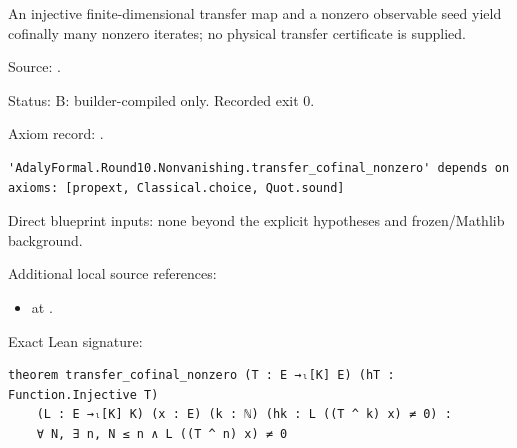 \begin{theorem}[bp-187]
\label{bp-187}
\uses{}
\leanok
An injective finite-dimensional transfer map and a nonzero observable seed yield cofinally many nonzero iterates; no physical transfer certificate is supplied.

\par Source: \texttt{}.
\par Status: B: builder-compiled only. Recorded exit 0.
\par Axiom record: \texttt{}.
\begin{verbatim}
'AdalyFormal.Round10.Nonvanishing.transfer_cofinal_nonzero' depends on axioms: [propext, Classical.choice, Quot.sound]
\end{verbatim}
\par Direct blueprint inputs: none beyond the explicit hypotheses and frozen/Mathlib background.
\par Additional local source references:
\begin{itemize}
\item \texttt{} at \texttt{}.
\end{itemize}
\par Exact Lean signature:
\begin{verbatim}
theorem transfer_cofinal_nonzero (T : E →ₗ[K] E) (hT : Function.Injective T)
    (L : E →ₗ[K] K) (x : E) (k : ℕ) (hk : L ((T ^ k) x) ≠ 0) :
    ∀ N, ∃ n, N ≤ n ∧ L ((T ^ n) x) ≠ 0
\end{verbatim}
\end{theorem}

